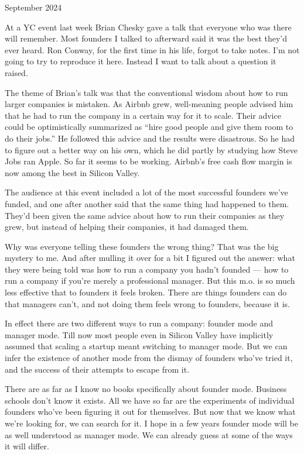 September 2024

At a YC event last week Brian Chesky gave a talk that everyone who was
there will remember. Most founders I talked to afterward said it was the
best they'd ever heard. Ron Conway, for the first time in his life,
forgot to take notes. I'm not going to try to reproduce it here. Instead
I want to talk about a question it raised.

The theme of Brian's talk was that the conventional wisdom about how to
run larger companies is mistaken. As Airbnb grew, well-meaning people
advised him that he had to run the company in a certain way for it to
scale. Their advice could be optimistically summarized as ``hire good
people and give them room to do their jobs.'' He followed this advice
and the results were disastrous. So he had to figure out a better way on
his own, which he did partly by studying how Steve Jobs ran Apple. So
far it seems to be working. Airbnb's free cash flow margin is now among
the best in Silicon Valley.

The audience at this event included a lot of the most successful
founders we've funded, and one after another said that the same thing
had happened to them. They'd been given the same advice about how to run
their companies as they grew, but instead of helping their companies, it
had damaged them.

Why was everyone telling these founders the wrong thing? That was the
big mystery to me. And after mulling it over for a bit I figured out the
answer: what they were being told was how to run a company you hadn't
founded --- how to run a company if you're merely a professional
manager. But this m.o. is so much less effective that to founders it
feels broken. There are things founders can do that managers can't, and
not doing them feels wrong to founders, because it is.

In effect there are two different ways to run a company: founder mode
and manager mode. Till now most people even in Silicon Valley have
implicitly assumed that scaling a startup meant switching to manager
mode. But we can infer the existence of another mode from the dismay of
founders who've tried it, and the success of their attempts to escape
from it.

There are as far as I know no books specifically about founder mode.
Business schools don't know it exists. All we have so far are the
experiments of individual founders who've been figuring it out for
themselves. But now that we know what we're looking for, we can search
for it. I hope in a few years founder mode will be as well understood as
manager mode. We can already guess at some of the ways it will differ.

